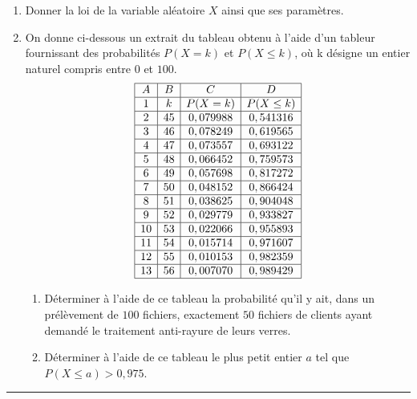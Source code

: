 \documentclass[../PolyS4.tex]{subfiles}
\begin{document}
\begin{enumerate}
\item
Donner la loi de la variable aléatoire $X$ ainsi que ses paramètres.
\item On donne ci-dessous un extrait du tableau obtenu à l'aide d'un tableur fournissant des probabilités
$P(X = k)$ et $P(X \leq k)$, où k désigne un entier naturel compris entre $0$ et $100$.
$$
\begin{array}{|c|c|c|c|}
\hline
A &B &C& D\\
\hline
1 &k &P(X = k)& P(X \leq k)\\
\hline
2 &45 &0,079988& 0,541316\\
\hline
3 &46 &0,078249 &0,619565\\
\hline
4 &47 &0,073557& 0,693122\\
\hline
5 &48 &0,066452 &0,759573\\
\hline
6 &49 &0,057698 &0,817272\\
\hline
7 &50 &0,048152 &0,866424\\
\hline
8 &51 &0,038625 &0,904048\\
\hline
9 &52 &0,029779 &0,933827\\
\hline
10& 53 &0,022066 &0,955893\\
\hline
11& 54 &0,015714 &0,971607\\
\hline
12 &55 &0,010153 &0,982359\\
\hline
13 &56& 0,007070 &0,989429\\
\hline
\end{array}$$

\begin{enumerate}
\item Déterminer à l'aide de ce tableau la probabilité qu'il y ait, dans un prélèvement de $100$ fichiers, exactement $50$ fichiers de clients ayant demandé le traitement anti-rayure de leurs verres.
\item Déterminer à l'aide de ce tableau le plus petit entier $a$ tel que $P(X \leq a) > 0, 975$.\\

\end{enumerate}
\end{enumerate}

\hrule

\end{document}
